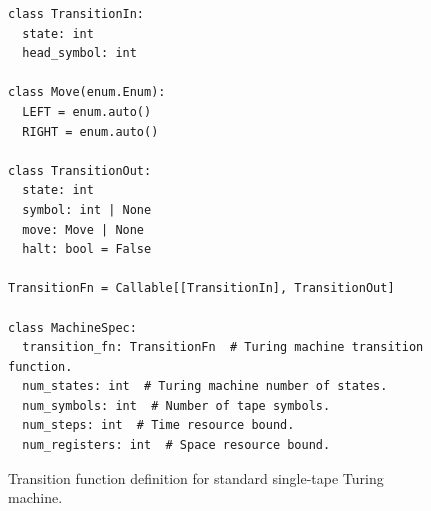 \begin{figure}[ht]
\centering
\begin{verbatim}
class TransitionIn:
  state: int
  head_symbol: int

class Move(enum.Enum):
  LEFT = enum.auto()
  RIGHT = enum.auto()

class TransitionOut:
  state: int
  symbol: int | None
  move: Move | None
  halt: bool = False

TransitionFn = Callable[[TransitionIn], TransitionOut]

class MachineSpec:
  transition_fn: TransitionFn  # Turing machine transition function.
  num_states: int  # Turing machine number of states.
  num_symbols: int  # Number of tape symbols.
  num_steps: int  # Time resource bound.
  num_registers: int  # Space resource bound.
\end{verbatim}
\caption{Transition function definition for standard single-tape Turing machine.}
\label{fig:single_tape_turing_machine}
\end{figure}
